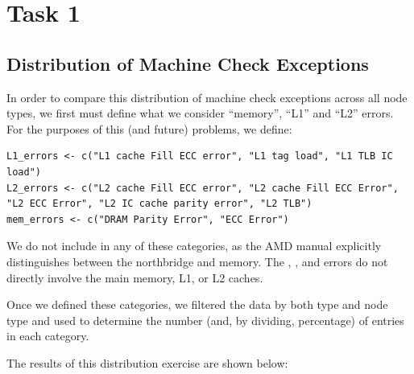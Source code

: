 \section{Task 1}

\subsection{Distribution of Machine Check Exceptions}

In order to compare this distribution of machine check exceptions across all node types, we first must define what we consider ``memory'', ``L1'' and ``L2'' errors.  For the purposes of this (and future) problems, we define:

\begin{verbatim}
L1_errors <- c("L1 cache Fill ECC error", "L1 tag load", "L1 TLB IC load")
L2_errors <- c("L2 cache Fill ECC error", "L2 cache Fill ECC Error", "L2 ECC Error", "L2 IC cache parity error", "L2 TLB")
mem_errors <- c("DRAM Parity Error", "ECC Error")
\end{verbatim}

We do not include  in any of these categories, as the AMD manual explicitly distinguishes between the northbridge and memory.  The , , and  errors do not directly involve the main memory, L1, or L2 caches.

Once we defined these categories, we filtered the data by both type and node type and used  to determine the number (and, by dividing, percentage) of entries in each category.

The results of this distribution exercise are shown below:

